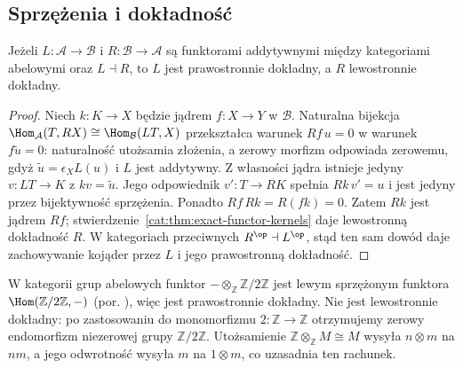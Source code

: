 \subsection{Sprzężenia i dokładność}
\begin{twierdzenie}\label{cat:thm:adjoint-exactness}
Jeżeli $L:\mathcal A\to\mathcal B$ i $R:\mathcal B\to\mathcal A$ są funktorami addytywnymi między kategoriami abelowymi oraz $L\dashv R$, to $L$ jest prawostronnie dokładny, a $R$ lewostronnie dokładny.
\end{twierdzenie}
\begin{proof}
Niech $k:K\to X$ będzie jądrem $f:X\to Y$ w $\mathcal B$. Naturalna bijekcja $\Hom_{\mathcal A}(T,RX)\cong\Hom_{\mathcal B}(LT,X)$ przekształca warunek $Rf\,u=0$ w warunek $f\widetilde u=0$: naturalność utożsamia złożenia, a zerowy morfizm odpowiada zerowemu, gdyż $\widetilde u=\epsilon_X L(u)$ i $L$ jest addytywny. Z własności jądra istnieje jedyny $v:LT\to K$ z $kv=\widetilde u$. Jego odpowiednik $v':T\to RK$ spełnia $Rk\,v'=u$ i jest jedyny przez bijektywność sprzężenia. Ponadto $Rf\,Rk=R(fk)=0$. Zatem $Rk$ jest jądrem $Rf$; stwierdzenie~\ref{cat:thm:exact-functor-kernels} daje lewostronną dokładność $R$. W kategoriach przeciwnych $R^{\op}\dashv L^{\op}$, stąd ten sam dowód daje zachowywanie kojąder przez $L$ i jego prawostronną dokładność.
\end{proof}
\begin{przyklad}
W kategorii grup abelowych funktor $-\otimes_{\mathbb Z}\mathbb Z/2\mathbb Z$ jest lewym sprzężonym funktora $\Hom(\mathbb Z/2\mathbb Z,-)$ (por. ), więc jest prawostronnie dokładny. Nie jest lewostronnie dokładny: po zastosowaniu do monomorfizmu $2:\mathbb Z\to\mathbb Z$ otrzymujemy zerowy endomorfizm niezerowej grupy $\mathbb Z/2\mathbb Z$. Utożsamienie $\mathbb Z\otimes_{\mathbb Z}M\cong M$ wysyła $n\otimes m$ na $nm$, a jego odwrotność wysyła $m$ na $1\otimes m$, co uzasadnia ten rachunek.
\end{przyklad}

